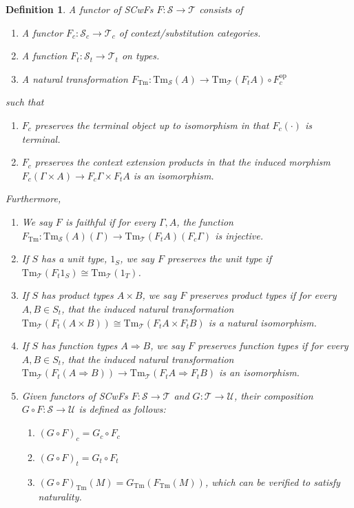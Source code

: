 \documentclass[12pt]{article}
\newtheorem{definition}{Definition}
\newcommand{\cat}{\mathcal}
\newcommand{\Tm}{\mathrm{Tm}}
\begin{document}
\begin{definition}
  A functor of SCwFs $F : \cat S \to \cat T$ consists of
  \begin{enumerate}
  \item A functor $F_c : \cat S_c \to \cat T_c$ of context/substitution categories.
  \item A function $F_t : \cat S_t \to \cat T_t$ on types.
  \item A natural transformation $F_{\Tm} : \Tm_{\cat S}(A) \to \Tm_{\cat T}(F_tA) \circ F_c^{\textrm{op}}$
  \end{enumerate}
  such that
  \begin{enumerate}
  \item $F_c$ preserves the terminal object up to isomorphism in that $F_c(\cdot)$ is terminal.
  \item $F_c$ preserves the context extension products in that the induced
    morphism $F_c(\Gamma \times A) \to F_c\Gamma \times F_t A$ is an isomorphism.
  \end{enumerate}

  Furthermore,
  \begin{enumerate}
  \item We say $F$ is \emph{faithful} if for every $\Gamma, A$, the
    function $F_{\Tm} : \Tm_{\cat S}(A)(\Gamma) \to \Tm_{\cat T}(F_tA)(F_c\Gamma)$
    is injective.
  \item If $S$ has a unit type, $1_S$, we say $F$ preserves the unit type
    if $\Tm_{\cat T}(F_t1_S) \cong \Tm_{\cat T}(1_T)$.
  \item If $S$ has product types $A \times B$, we say $F$ preserves
    product types if for every $A,B \in S_t$, that the induced natural
    transformation $\Tm_{\cat T}(F_t(A \times B)) \cong \Tm_{\cat T}(F_tA \times
    F_tB)$ is a natural isomorphism.
  \item If $S$ has function types $A \Rightarrow B$, we say $F$
    preserves function types if for every $A,B \in S_t$, that the
    induced natural transformation $\Tm_{\cat T}(F_t(A \Rightarrow B)) \to
    \Tm_{\cat T}(F_tA \Rightarrow F_tB)$ is an isomorphism.
  \item Given functors of SCwFs $F : \cat S \to \cat T$ and $G : \cat
    T \to \cat U$, their composition $G \circ F : \cat S \to \cat U$
    is defined as follows:
    \begin{enumerate}
    \item $(G \circ F)_c = G_c \circ F_c$
    \item $(G \circ F)_{t} = G_t \circ F_t$
    \item $(G \circ F)_{\Tm}(M) = G_{\Tm}(F_{\Tm}(M))$, which can be verified to satisfy naturality.
    \end{enumerate}
  \end{enumerate}
\end{definition}
\end{document}
